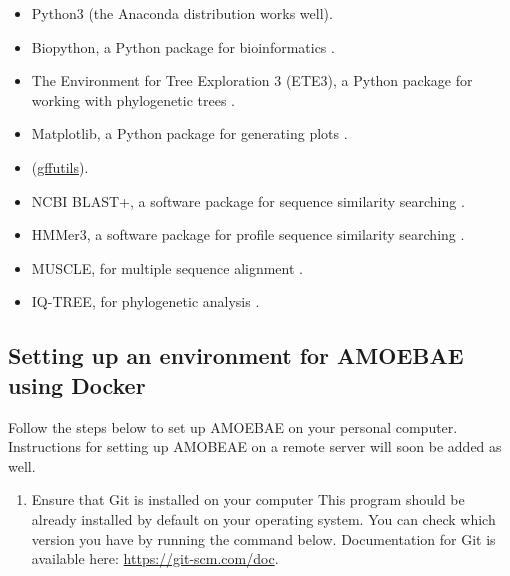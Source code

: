\documentclass[12pt,letterpaper]{article}
\begin{document}
\begin{linenumbers}
\begin{itemize}

\item Python3 (the Anaconda distribution works well).

\item Biopython, a Python package for bioinformatics \citep{cock2009}.

\item The Environment for Tree Exploration 3 (ETE3), a Python package for
    working with phylogenetic trees \citep{huerta-cepas2016}.

\item Matplotlib, a Python package for generating plots \citep{hunter2007}.

\item (\href{https://pythonhosted.org/gffutils/}{gffutils}).

\item NCBI BLAST+, a software package for sequence similarity searching \citep{camacho2009}.

\item HMMer3, a software package for profile sequence similarity searching \citep{eddy1998}.

\item MUSCLE, for multiple sequence alignment \citep{edgar2004}.

\item IQ-TREE, for phylogenetic analysis \citep{nguyen2015}.


\end{itemize}


\subsection{Setting up an environment for AMOEBAE using Docker}
\label{setup_section}


Follow the steps below to set up AMOEBAE on your personal computer.
Instructions for setting up AMOBEAE on a remote server will soon be added as
well.

\begin{enumerate}

\item Ensure that Git is installed on your computer This program should be
    already installed by default on your operating system. You can check
    which version you have by running the command below. Documentation for
    Git is available here: \url{https://git-scm.com/doc}. 


\end{enumerate}
\end{linenumbers}
\end{document}
